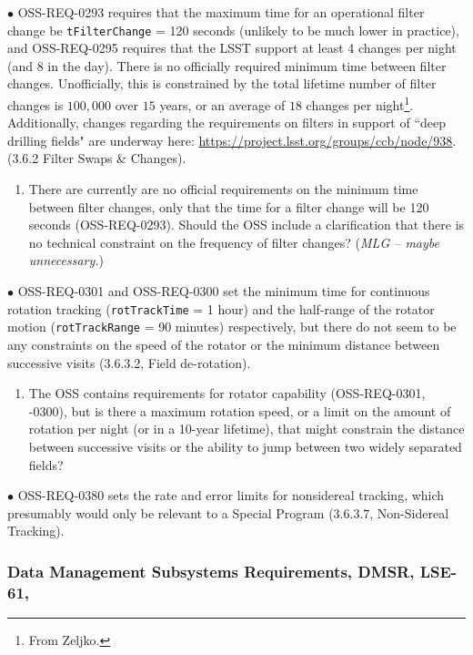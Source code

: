\documentclass[DM,lsstdraft,toc]{lsstdoc}
\begin{document}
$\bullet$ OSS-REQ-0293 requires that the maximum time for an operational filter change be {\tt tFilterChange} = 120 seconds (unlikely to be much lower in practice), and OSS-REQ-0295 requires that the LSST support at least 4 changes per night (and 8 in the day). There is no officially required minimum time between filter changes. Unofficially, this is constrained by the total lifetime number of filter changes is $100,000$ over $15$ years, or an average of $18$ changes per night\footnote{From Zeljko.}. Additionally, changes regarding the requirements on filters in support of ``deep drilling fields" are underway here: \url{https://project.lsst.org/groups/ccb/node/938}. (3.6.2 Filter Swaps \& Changes).
\begin{enumerate}[topsep=-10pt,after=\vspace{10pt},label= \textbf{Concern \Roman*.},resume] \item \label{OSS-6}   There are currently are no official requirements on the minimum time between filter changes, only that the time for a filter change will be 120 seconds (OSS-REQ-0293). Should the OSS include a clarification that there is no technical constraint on the frequency of filter changes? ({\it MLG -- maybe unnecessary.}) \end{enumerate}

$\bullet$ OSS-REQ-0301 and OSS-REQ-0300 set the minimum time for continuous rotation tracking ({\tt rotTrackTime} = 1 hour) and the half-range of the rotator motion ({\tt rotTrackRange} = 90 minutes) respectively, but there do not seem to be any constraints on the speed of the rotator or the minimum distance between successive visits (3.6.3.2, Field de-rotation). 
\begin{enumerate}[topsep=-10pt,after=\vspace{10pt},label= \textbf{Concern \Roman*.},resume] \item \label{OSS-7} The OSS contains requirements for rotator capability (OSS-REQ-0301, -0300), but is there a maximum rotation speed, or a limit on the amount of rotation per night (or in a 10-year lifetime), that might constrain the distance between successive visits or the ability to jump between two widely separated fields? \end{enumerate}

$\bullet$ OSS-REQ-0380 sets the rate and error limits for nonsidereal tracking, which presumably would only be relevant to a Special Program (3.6.3.7, Non-Sidereal Tracking).


\subsubsection{Data Management Subsystems Requirements, DMSR, LSE-61, \cite{LSE-61}}\label{sssec:dmplans_review_dmsr}
\end{document}
